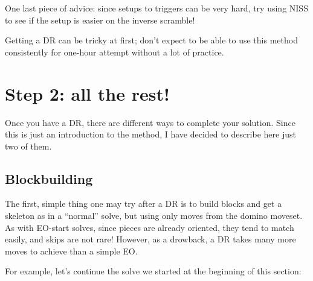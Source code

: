 \documentclass[11pt,a4paper]{book}
\begin{document}
One last piece of advice: since setups to triggers can be very hard, try using NISS to see if the setup is easier on the inverse scramble!

Getting a DR can be tricky at first; don't expect to be able to use this method consistently for one-hour attempt without a lot of practice.

\section{Step 2: all the rest!}

Once you have a DR, there are different ways to complete your solution. Since this is just an introduction to the method, I have decided to describe here just two of them.

\subsection{Blockbuilding}

The first, simple thing one may try after a DR is to build blocks and get a skeleton as in a ``normal'' solve, but using only moves from the domino moveset. As with EO-start solves, since pieces are already oriented, they tend to match easily, and skips are not rare! However, as a drowback, a DR takes many more moves to achieve than a simple EO.

For example, let's continue the solve we started at the beginning of this section:
\end{document}
